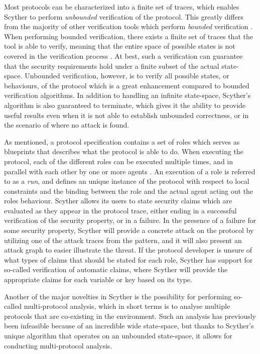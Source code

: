 Most protocols can be characterized into a finite set of traces, which enables Scyther to perform \emph{unbounded} verification of the protocol. This greatly differs from the majority of other verification tools which perform \emph{bounded} verification \cite{cremers2008scyther} \cite{cremers2009comparing}. When performing bounded verification, there exists a finite set of traces that the tool is able to verify, meaning that the entire space of possible states is not covered in the verification process \cite{cremers2008unbounded}. At best, such a verification can guarantee that the security requirements hold under a finite subset of the actual state-space. Unbounded verification, however, is to verify all possible states, or behaviours, of the protocol which is a great enhancement compared to bounded verification algorithms. In addition to handling an infinite state-space, Scyther's algorithm is also guaranteed to terminate, which gives it the ability to provide useful results even when it is not able to establish unbounded correctness, or in the scenario of where no attack is found.

As mentioned, a protocol specification contains a set of roles which serves as blueprints that describes what the protocol is able to do. When executing the protocol, each of the different roles can be executed multiple times, and in parallel with each other by one or more agents \cite{cremers2006scyther}. An execution of a role is referred to as a \emph{run}, and defines an unique instance of the protocol with respect to local constraints and the binding between the role and the actual agent acting out the roles behaviour. Scyther allows its users to state security claims which are evaluated as they appear in the protocol trace, either ending in a successful verification of the security property, or in a failure. In the presence of a failure for some security property, Scyther will provide a concrete attack on the protocol by utilizing one of the attack traces from the pattern, and it will also present an attack graph to easier illustrate the  threat. If the protocol developer is unsure of what types of claims that should be stated for each role, Scyther has support for so-called verification of automatic claims, where Scyther will provide the appropriate claims for each variable or key based on its type.

Another of the major novelties in Scyther is the possibility for performing so-called multi-protocol analysis, which in short terms is to analyse multiple protocols that are co-existing in the environment. Such an analysis has previously been infeasible because of an incredible wide state-space, but thanks to Scyther's unique algorithm that operates on an unbounded state-space, it allows for conducting multi-protocol analysis. 


